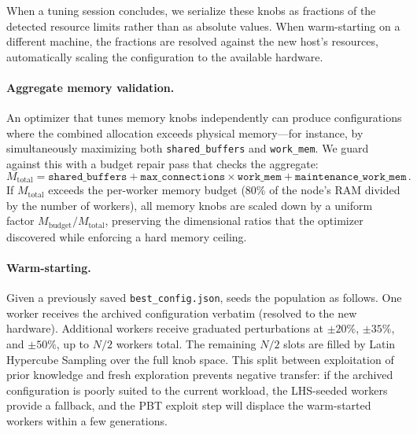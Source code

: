 When a tuning session concludes, we serialize these knobs as fractions of the
detected resource limits rather than as absolute values.  When warm-starting
on a different machine, the fractions are resolved against the new host's
resources, automatically scaling the configuration to the available hardware.

\paragraph{Aggregate memory validation.}
An optimizer that tunes memory knobs independently can produce configurations
where the combined allocation exceeds physical memory---for instance, by
simultaneously maximizing both \texttt{shared\_buffers} and
\texttt{work\_mem}.  We guard against this with a budget repair pass that
checks the aggregate:
\begin{equation}
  M_{\text{total}} = \texttt{shared\_buffers}
    + \texttt{max\_connections} \times \texttt{work\_mem}
    + \texttt{maintenance\_work\_mem}\,.
  \label{eq:mem-budget}
\end{equation}
If $M_{\text{total}}$ exceeds the per-worker memory budget (80\% of the
node's RAM divided by the number of workers), all memory knobs are scaled
down by a uniform factor $M_{\text{budget}} / M_{\text{total}}$, preserving
the dimensional ratios that the optimizer discovered while enforcing a hard
memory ceiling.

\paragraph{Warm-starting.}
Given a previously saved \texttt{best\_config.json}, \sysname seeds the
population as follows.  One worker receives the archived configuration
verbatim (resolved to the new hardware).  Additional workers receive
graduated perturbations at $\pm 20\%$, $\pm 35\%$, and $\pm 50\%$, up to
$N/2$ workers total.  The remaining $N/2$ slots are filled by Latin Hypercube
Sampling over the full knob space.  This split between exploitation of prior
knowledge and fresh exploration prevents negative transfer: if the archived
configuration is poorly suited to the current workload, the LHS-seeded
workers provide a fallback, and the PBT exploit step will displace the
warm-started workers within a few generations.
